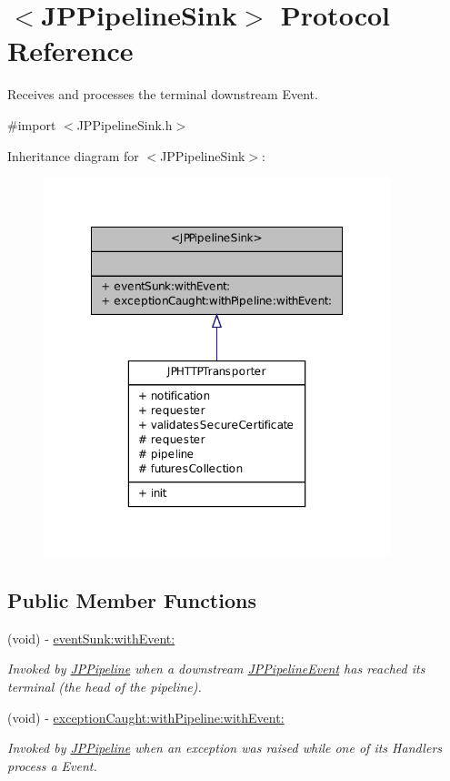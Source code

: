 \hypertarget{a00034}{
\section{$<$JPPipelineSink$>$ Protocol Reference}
\label{a00034}
}


Receives and processes the terminal downstream Event.  




{\ttfamily \#import $<$JPPipelineSink.h$>$}



Inheritance diagram for $<$JPPipelineSink$>$:\nopagebreak
\begin{figure}[H]
\begin{center}
\leavevmode
\includegraphics[width=286pt]{a00150}
\end{center}
\end{figure}
\subsection*{Public Member Functions}
\begin{DoxyCompactItemize}
\item 
(void) -\/ \hyperlink{a00034_a59e6e19fa75fbeff790d70d9aff76533}{eventSunk:withEvent:}
\begin{DoxyCompactList}\small\item\em Invoked by \hyperlink{a00019}{JPPipeline} when a downstream \hyperlink{a00023}{JPPipelineEvent} has reached its terminal (the head of the pipeline). \item\end{DoxyCompactList}\item 
(void) -\/ \hyperlink{a00034_af1cfabf45bca3d7b50af45c7c0d0323a}{exceptionCaught:withPipeline:withEvent:}
\begin{DoxyCompactList}\small\item\em Invoked by \hyperlink{a00019}{JPPipeline} when an exception was raised while one of its Handlers process a Event. \item\end{DoxyCompactList}\end{DoxyCompactItemize}


